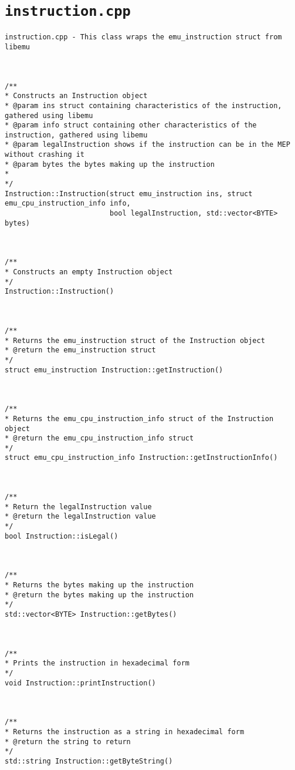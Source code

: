 \documentclass[11pt,twoside]{eitExjobb}
\begin{document}
\section{\texttt{instruction.cpp}}
\begin{Verbatim}[fontsize=\tiny]
instruction.cpp - This class wraps the emu_instruction struct from libemu



/**
* Constructs an Instruction object
* @param ins struct containing characteristics of the instruction, gathered using libemu
* @param info struct containing other characteristics of the instruction, gathered using libemu
* @param legalInstruction shows if the instruction can be in the MEP without crashing it
* @param bytes the bytes making up the instruction
*
*/
Instruction::Instruction(struct emu_instruction ins, struct emu_cpu_instruction_info info, 
                         bool legalInstruction, std::vector<BYTE> bytes)



/**
* Constructs an empty Instruction object
*/
Instruction::Instruction()



/**
* Returns the emu_instruction struct of the Instruction object
* @return the emu_instruction struct
*/
struct emu_instruction Instruction::getInstruction()



/**
* Returns the emu_cpu_instruction_info struct of the Instruction object
* @return the emu_cpu_instruction_info struct
*/
struct emu_cpu_instruction_info Instruction::getInstructionInfo()



/**
* Return the legalInstruction value
* @return the legalInstruction value
*/
bool Instruction::isLegal()



/**
* Returns the bytes making up the instruction
* @return the bytes making up the instruction
*/
std::vector<BYTE> Instruction::getBytes()



/**
* Prints the instruction in hexadecimal form
*/
void Instruction::printInstruction()



/**
* Returns the instruction as a string in hexadecimal form 
* @return the string to return
*/
std::string Instruction::getByteString()
\end{Verbatim}
\end{document}

